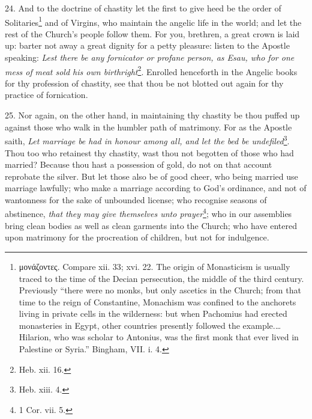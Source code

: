 24. And to the doctrine of chastity let the first to give heed be the order of Solitaries\footnote{\textgreek{μονάζοντες}. Compare xii. 33; xvi. 22. The origin of Monasticism is usually traced to the time of the Decian persecution, the middle of the third century. Previously “there were no monks, but only ascetics in the Church; from that time to the reign of Constantine, Monachism was confined to the anchorets living in private cells in the wilderness: but when Pachomius had erected monasteries in Egypt, other countries presently followed the example.…Hilarion, who was scholar to Antonius, was the first monk that ever lived in Palestine or Syria.” Bingham, VII. i. 4.} and of Virgins, who maintain the angelic life in the world; and let the rest of the Church’s people follow them. For you, brethren, a great crown is laid up: barter not away a great dignity for a petty pleasure: listen to the Apostle speaking: \emph{Lest there be any fornicator or profane person, as Esau, who for one mess of} \emph{meat sold his own birthright}\footnote{Heb. xii. 16.}. Enrolled henceforth in the Angelic books for thy profession of chastity, see that thou be not blotted out again for thy practice of fornication.

25. Nor again, on the other hand, in maintaining thy chastity be thou puffed up against those who walk in the humbler path of matrimony. For as the Apostle saith, \emph{Let marriage be had in honour among all, and let the bed be undefiled}\footnote{Heb. xiii. 4.}. Thou too who retainest thy chastity, wast thou not begotten of those who had married? Because thou hast a possession of gold, do not on that account reprobate the silver. But let those also be of good cheer, who being married use marriage lawfully; who make a marriage according to God’s ordinance, and not of wantonness for the sake of unbounded license; who recognise seasons of abstinence, \emph{that they may give themselves unto prayer}\footnote{1 Cor. vii. 5.}; who in our assemblies bring clean bodies as well as clean garments into the Church; who have entered upon matrimony for the procreation of children, but not for indulgence.

